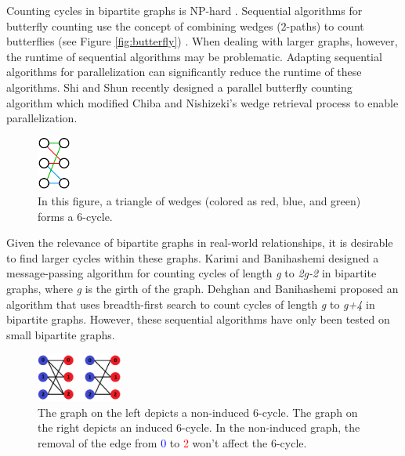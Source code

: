 \documentclass[11pt]{article}
\newcommand{\blue}[1]{\textcolor{blue}{#1}}
\newcommand{\red}[1]{\textcolor{red}{#1}}
\begin{document}
Counting cycles in bipartite graphs is NP-hard \cite{flum2004parameterized}.
Sequential algorithms for butterfly counting use the concept of combining wedges (2-paths) to count butterflies (see Figure \ref{fig:butterfly}) \cite{wang2014rectangle, sanei2018butterfly, chiba1985arboricity}.
When dealing with larger graphs, however, the runtime of sequential algorithms may be problematic.
Adapting sequential algorithms for parallelization can significantly reduce the runtime of these algorithms.
Shi and Shun \cite{shi2019parallel} recently designed a parallel butterfly counting algorithm which modified Chiba and Nishizeki's wedge retrieval process \cite{chiba1985arboricity} to enable parallelization.

\begin{figure}[h]
    \centering
    \includegraphics[width=0.1\textwidth]{figures/Triangle.png}
    \caption{\small In this figure, a triangle of wedges (colored as red, blue, and green) forms a 6-cycle.}
    \label{fig:triangle}
\end{figure}

Given the relevance of bipartite graphs in real-world relationships, it is desirable to find larger cycles within these graphs.
Karimi and Banihashemi \cite{karimi2012message} designed a message-passing algorithm for counting cycles of length \textit{g} to \textit{2g-2} in bipartite graphs, where \textit{g} is the girth of the graph.
Dehghan and Banihashemi \cite{dehghan2019counting} proposed an algorithm that uses breadth-first search to count cycles of length \textit{g}  to \textit{g+4} in bipartite graphs.
However, these sequential algorithms have only been tested on small bipartite graphs.

\begin{figure}[h]
    \centering
    \includegraphics[width=0.25\textwidth]{figures/Induced vs Noninduced.png}
    \caption{\small The graph on the left depicts a non-induced 6-cycle. The graph on the right depicts an induced 6-cycle. In the non-induced graph, the removal of the edge from \blue{0} to \red{2} won't affect the 6-cycle.}
    \label{fig:induced}
\end{figure}
\end{document}
